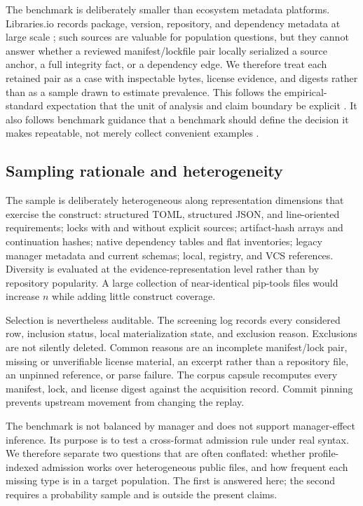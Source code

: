 \documentclass[10pt,conference]{IEEEtran}
\begin{document}
The benchmark is deliberately smaller than ecosystem metadata platforms. Libraries.io records package, version, repository, and dependency metadata at large scale \cite{katz2020librariesio}; such sources are valuable for population questions, but they cannot answer whether a reviewed manifest/lockfile pair locally serialized a source anchor, a full integrity fact, or a dependency edge. We therefore treat each retained pair as a case with inspectable bytes, license evidence, and digests rather than as a sample drawn to estimate prevalence. This follows the empirical-standard expectation that the unit of analysis and claim boundary be explicit \cite{ralph2021sigsoft}. It also follows benchmark guidance that a benchmark should define the decision it makes repeatable, not merely collect convenient examples \cite{hasselbring2021benchmarking}.

\subsection{Sampling rationale and heterogeneity}
The sample is deliberately heterogeneous along representation dimensions that exercise the construct: structured TOML, structured JSON, and line-oriented requirements; locks with and without explicit sources; artifact-hash arrays and continuation hashes; native dependency tables and flat inventories; legacy manager metadata and current schemas; local, registry, and VCS references. Diversity is evaluated at the evidence-representation level rather than by repository popularity. A large collection of near-identical pip-tools files would increase $n$ while adding little construct coverage.

Selection is nevertheless auditable. The screening log records every considered row, inclusion status, local materialization state, and exclusion reason. Exclusions are not silently deleted. Common reasons are an incomplete manifest/lock pair, missing or unverifiable license material, an excerpt rather than a repository file, an unpinned reference, or parse failure. The corpus capsule recomputes every manifest, lock, and license digest against the acquisition record. Commit pinning prevents upstream movement from changing the replay.

The benchmark is not balanced by manager and does not support manager-effect inference. Its purpose is to test a cross-format admission rule under real syntax. We therefore separate two questions that are often conflated: whether profile-indexed admission works over heterogeneous public files, and how frequent each missing type is in a target population. The first is answered here; the second requires a probability sample and is outside the present claims.
\end{document}
